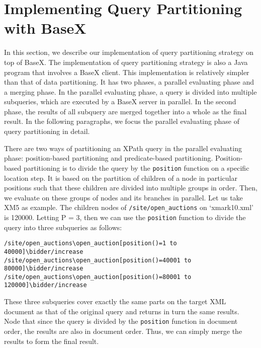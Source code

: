 \section{Implementing Query Partitioning with BaseX}
\label{sect:qpsimpl}

In this section, we describe our implementation of query partitioning strategy
on top of BaseX. The implementation of query partitioning strategy is also a
Java program that involves a BaseX client. This implementation is relatively
simpler than that of data partitioning.  It has two phases, a parallel
evaluating phase and a merging phase.  In the parallel evaluating phase, a query
is divided into multiple subqueries, which are executed by a BaseX server in
parallel. In the second phase, the results of all subquery are merged together
into a whole as the final result. In the following paragraphs, we focus the
parallel evaluating phase  of query partitioning in detail.


There are two ways of partitioning an XPath query in the parallel evaluating
phase: position-based partitioning and predicate-based partitioning.
Position-based partitioning is to divide the query by the \texttt{position}
function on a specific location step.  It is based on the partition of children
of a node in particular positions such that these children are divided into
multiple groups in order. Then, we evaluate on these groups of nodes and its
branches in parallel. Let us take XM5 as example. The children nodes of
\texttt{/site/open\_auctions} on `xmark10.xml' is 120000. Letting P = 3, then we
can use the \texttt{position} function to divide the query into three subqueries
as follows:

\begin{small}
	\verb|/site/open_auctions\open_auction[position()=1 to 40000]\bidder/increase|\\
	\verb|/site/open_auctions\open_auction[position()=40001 to 80000]\bidder/increase|\\
	\verb|/site/open_auctions\open_auction[position()=80001 to 120000]\bidder/increase|\\
\end{small}

These three subqueries cover exactly the same parts on the target XML document
as that of the original query and returns in turn the same results.  Node that
since the query is divided by the \texttt{position} function in document order,
the results are also in document order. Thus, we can simply merge the results to
form the final result.

